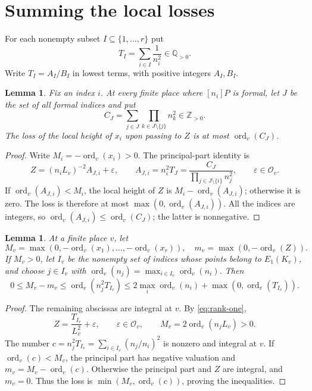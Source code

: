 \documentclass[11pt,a4paper]{article}
\newtheorem{lemma}[theorem]{Lemma}
\newcommand{\Q}{\mathbb Q}\newcommand{\Z}{\mathbb Z}
\newcommand{\ord}{\operatorname{ord}}
\begin{document}
\section{Summing the local losses}

For each nonempty subset $I\subseteq\{1,\ldots,r\}$ put
\[
 T_I=\sum_{i\in I}\frac1{n_i^2}\in\Q_{>0}.
\]
Write $T_I=A_I/B_I$ in lowest terms, with positive integers
$A_I,B_I$.

\begin{lemma}\label{lem:fixed-target}
Fix an index $i$. At every finite place where $[n_i]P$ is
formal, let $J$ be the set of all formal indices and put
\[
 C_J=\sum_{j\in J}\prod_{k\in J\setminus\{j\}}n_k^2
       \in\Z_{>0}.
\]
The loss of the local height of $x_i$ upon passing to $Z$ is
at most $\ord_v(C_J)$.
\end{lemma}
\begin{proof}
Write $M_i=-\ord_v(x_i)>0$. The principal-part identity is
\[
 Z=(n_iL_v)^{-2}A_{J,i}+\varepsilon,
 \qquad
 A_{J,i}=n_i^2T_J
       =\frac{C_J}{\prod_{j\in J\setminus\{i\}}n_j^2},
 \qquad\varepsilon\in\mathcal O_v.
\]
If $\ord_v(A_{J,i})<M_i$, the local height of $Z$ is
$M_i-\ord_v(A_{J,i})$; otherwise it is zero. The loss is
therefore at most $\max(0,\ord_v(A_{J,i}))$.
All the indices are integers, so
$\ord_v(A_{J,i})\le\ord_v(C_J)$; the latter is nonnegative.
\end{proof}

\begin{lemma}\label{lem:loss}
At a finite place $v$, let
\[
 M_v=\max(0,-\ord_v(x_1),\ldots,-\ord_v(x_r)),\quad
 m_v=\max(0,-\ord_v(Z)).
\]
If $M_v>0$, let $I_v$ be the nonempty set of indices whose
points belong to $E_1(K_v)$, and choose $j\in I_v$ with
$\ord_v(n_j)=\max_{i\in I_v}\ord_v(n_i)$. Then
\[
 0\le M_v-m_v\le
 \ord_v(n_j^2T_{I_v})
 \le2\max_i\ord_v(n_i)+\max(0,\ord_v(T_{I_v})).
\]
\end{lemma}
\begin{proof}
The remaining abscissas are integral at $v$. By
\eqref{eq:rank-one},
\[
 Z=\frac{T_{I_v}}{L_v^2}+\varepsilon,
 \qquad\varepsilon\in\mathcal O_v,
 \qquad M_v=2\ord_v(n_jL_v)>0.
\]
The number
$c=n_j^2T_{I_v}=\sum_{i\in I_v}(n_j/n_i)^2$
is nonzero and integral at $v$. If $\ord_v(c)<M_v$, the
principal part has negative valuation and
$m_v=M_v-\ord_v(c)$. Otherwise the principal part and $Z$
are integral, and $m_v=0$. Thus the loss is
$\min(M_v,\ord_v(c))$, proving the inequalities.
\end{proof}
\end{document}

